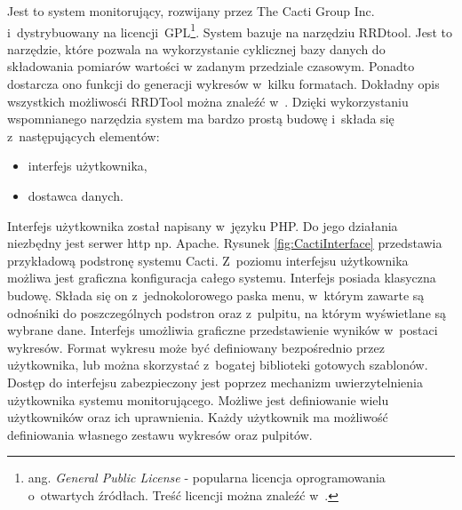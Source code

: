 Jest to system monitorujący, rozwijany przez The Cacti Group
Inc. i~dystrybuowany na licencji~GPL\footnote{ ang. {\em General
    Public License} - popularna licencja oprogramowania o~otwartych
  źródłach. Treść licencji można znaleźć w~\cite{www:GPLv2}.}. System
bazuje na narzędziu RRDtool. Jest to narzędzie, które pozwala na
wykorzystanie cyklicznej bazy danych do składowania pomiarów wartości
w zadanym przedziale czasowym. Ponadto dostarcza ono funkcji do
generacji wykresów w~kilku formatach. Dokładny opis wszystkich
możliwosći RRDTool można znaleźć w~\cite{www:RRDtool}. Dzięki
wykorzystaniu wspomnianego narzędzia system ma bardzo prostą budowę
i~składa się z~następujących elementów:

\begin{itemize}
\item interfejs użytkownika,
\item dostawca danych.
\end{itemize}

Interfejs użytkownika został napisany w~języku PHP. Do jego działania
niezbędny jest serwer http np. Apache. Rysunek
\ref{fig:CactiInterface} przedstawia przykładową podstronę systemu
Cacti. Z~poziomu interfejsu użytkownika możliwa jest graficzna
konfiguracja całego systemu. Interfejs posiada klasyczna
budowę. Składa się on z~jednokolorowego paska menu, w~którym zawarte
są odnośniki do poszczególnych podstron oraz z~pulpitu, na którym
wyświetlane są wybrane dane. Interfejs umożliwia graficzne
przedstawienie wyników w~postaci wykresów. Format wykresu może być
definiowany bezpośrednio przez użytkownika, lub można skorzystać
z~bogatej biblioteki gotowych szablonów. Dostęp do interfejsu
zabezpieczony jest poprzez mechanizm uwierzytelnienia użytkownika
systemu monitorującego. Możliwe jest definiowanie wielu użytkowników
oraz ich uprawnienia. Każdy użytkownik ma możliwość definiowania
własnego zestawu wykresów oraz pulpitów.

